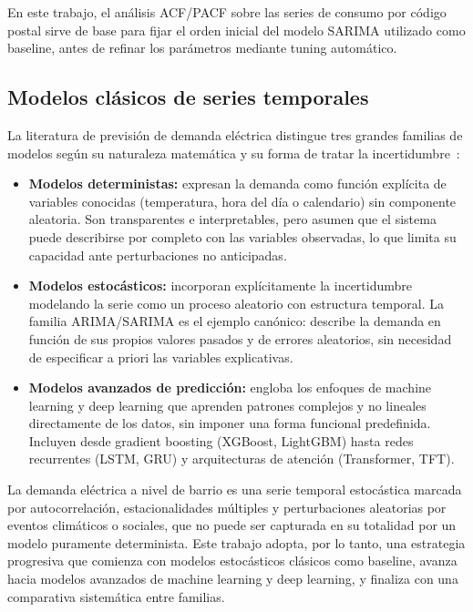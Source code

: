 \documentclass[12pt, a4paper]{article}
\begin{document}
En este trabajo, el análisis ACF/PACF sobre las series de consumo por código postal sirve de base para fijar el orden inicial del modelo SARIMA utilizado como baseline, antes de refinar los parámetros mediante tuning automático.

\subsection{Modelos clásicos de series temporales}

La literatura de previsión de demanda eléctrica distingue tres grandes familias de modelos según su naturaleza matemática y su forma de tratar la incertidumbre~\cite{eke2025}:

\begin{itemize}
    \item \textbf{Modelos deterministas:} expresan la demanda como función explícita de variables conocidas (temperatura, hora del día o calendario) sin componente aleatoria. Son transparentes e interpretables, pero asumen que el sistema puede describirse por completo con las variables observadas, lo que limita su capacidad ante perturbaciones no anticipadas.
    \item \textbf{Modelos estocásticos:} incorporan explícitamente la incertidumbre modelando la serie como un proceso aleatorio con estructura temporal. La familia ARIMA/SARIMA es el ejemplo canónico: describe la demanda en función de sus propios valores pasados y de errores aleatorios, sin necesidad de especificar a priori las variables explicativas.
    \item \textbf{Modelos avanzados de predicción:} engloba los enfoques de machine learning y deep learning que aprenden patrones complejos y no lineales directamente de los datos, sin imponer una forma funcional predefinida. Incluyen desde gradient boosting (XGBoost, LightGBM) hasta redes recurrentes (LSTM, GRU) y arquitecturas de atención (Transformer, TFT).
\end{itemize}

La demanda eléctrica a nivel de barrio es una serie temporal estocástica marcada por autocorrelación, estacionalidades múltiples y perturbaciones aleatorias por eventos climáticos o sociales, que no puede ser capturada en su totalidad por un modelo puramente determinista. Este trabajo adopta, por lo tanto, una estrategia progresiva que comienza con modelos estocásticos clásicos como baseline, avanza hacia modelos avanzados de machine learning y deep learning, y finaliza con una comparativa sistemática entre familias.
\end{document}
